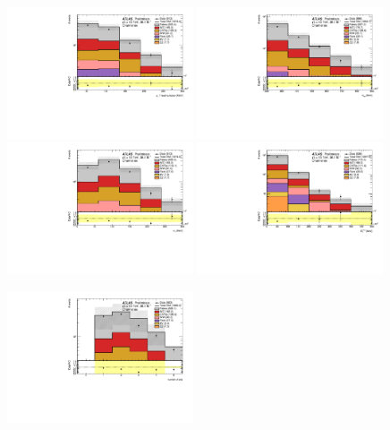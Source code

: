\begin{figure}[htbp]
\includegraphics[width=0.49\textwidth]{data/plot/DataFakes/FakeEff/IntNote_pTlead_ee.pdf}
\includegraphics[width=0.49\textwidth]{data/plot/DataFakes/FakeEff/IntNote_meff_ee.pdf}\\
\includegraphics[width=0.49\textwidth]{data/plot/DataFakes/FakeEff/IntNote_mT_ee.pdf}
\includegraphics[width=0.49\textwidth]{data/plot/DataFakes/FakeEff/IntNote_met_ee.pdf}\\
\begin{center}
\includegraphics[width=0.49\textwidth]{data/plot/DataFakes/FakeEff/IntNote_nJets_ee.pdf}

\end{center}
\end{figure}
